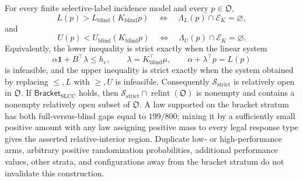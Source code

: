 For every finite selective-label incidence model and every \(p\in\mathfrak O\),
\[
L(p)>L_{\mathrm{blind}}(K_{\mathrm{blind}}p)
\quad\Longleftrightarrow\quad
\Lambda_L(p)\cap\mathcal E_K=\varnothing,
\]
and
\[
U(p)<U_{\mathrm{blind}}(K_{\mathrm{blind}}p)
\quad\Longleftrightarrow\quad
\Lambda_U(p)\cap\mathcal E_K=\varnothing.
\]
Equivalently, the lower inequality is strict exactly when the linear system
\[
\alpha\mathbf 1+B^{\top}\lambda\leq h_e,\qquad
\lambda=K_{\mathrm{blind}}^{\top}\mu,\qquad
\alpha+\lambda^{\top}p=L(p)
\]
is infeasible, and the upper inequality is strict exactly when the system obtained by replacing \(\leq,L\) with \(\geq,U\) is infeasible.  Consequently \(\mathcal S_{\mathrm{strict}}\) is relatively open in \(\mathfrak O\).  If \(\mathsf{Bracket}_{\mathrm{SLCC}}\) holds, then \(\mathcal S_{\mathrm{strict}}\cap\operatorname{relint}(\mathfrak O)\) is nonempty and contains a nonempty relatively open subset of \(\mathfrak O\).  A law supported on the bracket stratum has both full-versus-blind gaps equal to \(199/800\); mixing it by a sufficiently small positive amount with any law assigning positive mass to every legal response type gives the asserted relative-interior region.  Duplicate low- or high-performance arms, arbitrary positive randomization probabilities, additional performance values, other strata, and configurations away from the bracket stratum do not invalidate this construction.